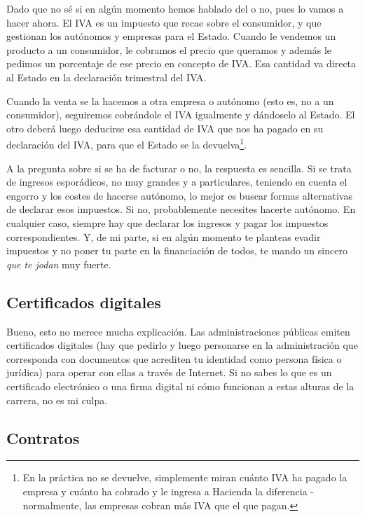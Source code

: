 \documentclass[nochap,palatino,notitlepage]{apuntes}
\begin{document}
Dado que no sé si en algún momento hemos hablado del  o no, pues lo vamos a hacer ahora. El IVA es un impuesto que recae sobre el consumidor, y que gestionan los autónomos y empresas para el Estado. Cuando le vendemos un producto a un consumidor, le cobramos el precio que queramos y además le pedimos un porcentaje de ese precio en concepto de IVA. Esa cantidad va directa al Estado en la declaración trimestral del IVA.

Cuando la venta se la hacemos a otra empresa o autónomo (esto es, no a un consumidor), seguiremos cobrándole el IVA igualmente y dándoselo al Estado. El otro deberá luego deducirse esa cantidad de IVA que nos ha pagado en su declaración del IVA, para que el Estado se la devuelva\footnote{En la práctica no se devuelve, simplemente miran cuánto IVA ha pagado la empresa y cuánto ha cobrado y le ingresa a Hacienda la diferencia - normalmente, las empresas cobran más IVA que el que pagan.}.

A la pregunta sobre si se ha de facturar o no, la respuesta es sencilla. Si se trata de ingresos esporádicos, no muy grandes y a particulares, teniendo en cuenta el engorro y los costes de hacerse autónomo, lo mejor es buscar formas alternativas de declarar esos impuestos. Si no, probablemente necesites hacerte autónomo. En cualquier caso, siempre hay que declarar los ingresos y pagar los impuestos correspondientes. Y, de mi parte, si en algún momento te planteas evadir impuestos y no poner tu parte en la financiación de todos, te mando un sincero \textit{que te jodan} muy fuerte.

\subsection{Certificados digitales}

Bueno, esto no merece mucha explicación. Las administraciones públicas emiten certificados digitales (hay que pedirlo y luego personarse en la administración que corresponda con documentos que acrediten tu identidad como persona física o jurídica) para operar con ellas a través de Internet. Si no sabes lo que es un certificado electrónico o una firma digital ni cómo funcionan a estas alturas de la carrera, no es mi culpa.

\subsection{Contratos}
\end{document}
